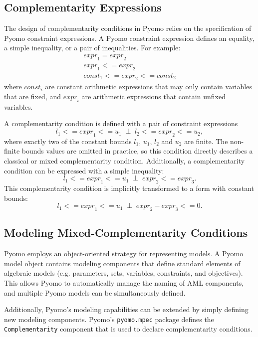 \subsection{Complementarity Expressions}

The design of complementarity conditions in Pyomo relies on the
specification of Pyomo constraint expressions.  A Pyomo constraint
expression defines an equality, a simple inequality, or a pair of
inequalities.  For example:
\[
\begin{array}{l}
{expr}_1 = {expr}_2\\
{expr}_1 <= {expr}_2\\
{const}_1 <= {expr}_2 <= {const}_2
\end{array}
\]
where ${const}_i$ are constant arithmetic expressions that may only
contain variables that are fixed, and ${expr}_i$ are arithmetic expressions
that contain unfixed variables.

A complementarity condition is defined with a pair of constraint expressions 
\[
{l}_1 <= {expr}_1 <= {u}_1 \;\;\bot\;\; {l}_2 <= {expr}_2 <= {u}_2,
\]
where exactly two of the constant bounds $l_1$, $u_1$, $l_2$ and
$u_2$ are finite.  The non-finite bounds values are omitted in
practice, so this condition directly describes a classical or mixed
complementarity condition.
Additionally, a complementarity condition can be expressed with a simple inequality:
\[
{l}_1 <= {expr}_1 <= {u}_1 \;\;\bot\;\; {expr}_2 <= {expr}_3.
\]
This complementarity condition is implicitly transformed to a form with constant bounds:
\[
{l}_1 <= {expr}_1 <= {u}_1 \;\;\bot\;\; {expr}_2 - {expr}_3 <= 0.
\]


\subsection{Modeling Mixed-Complementarity Conditions}

Pyomo employs an object-oriented strategy for representing models.
A Pyomo model object contains modeling components that define
standard elements of algebraic models (e.g. parameters, sets,
variables, constraints, and objectives).  This allows Pyomo to
automatically manage the naming of AML components, and multiple
Pyomo models can be simultaneously defined.

Additionally, Pyomo's modeling capabilities can be extended by
simply defining new modeling components.  Pyomo's \texttt{pyomo.mpec}
package defines the \texttt{Complementarity} component that is used
to declare complementarity conditions.

